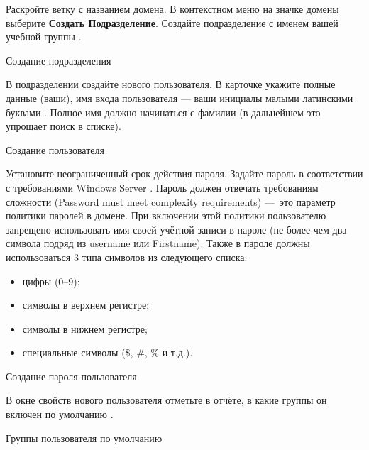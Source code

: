 Раскройте ветку с названием домена.
В контекстном меню на значке домены выберите
\textbf{Создать \rarrow Подразделение}.
Создайте подразделение с именем вашей учебной группы .

\begin{image}
	\caption{Создание подразделения}
	\label{fig:new:group}
\end{image}

В подразделении создайте нового пользователя.
В карточке укажите полные данные (ваши),
имя входа пользователя --- ваши инициалы малыми латинскими буквами
.
Полное имя должно начинаться с фамилии
(в дальнейшем это упрощает поиск в списке).

\begin{image}
	\caption{Создание пользователя}
	\label{fig:new:user}
\end{image}

Установите неограниченный срок действия пароля.
Задайте пароль в соответствии с требованиями Windows Server
.
Пароль должен отвечать требованиям сложности
(Password must meet complexity requirements)
---~это параметр политики паролей в домене.
При включении этой политики пользователю запрещено использовать
имя своей учётной записи в пароле
(не более чем два символа подряд из username или Firstname).
Также в пароле должны использоваться 3 типа символов из следующего списка:

\begin{itemize}
	\item цифры (0–9);
	\item символы в верхнем регистре;
	\item символы в нижнем регистре;
	\item специальные символы (\$, \#, \% и т.д.).
\end{itemize}

\begin{image}
	\caption{Создание пароля пользователя}
	\label{fig:new:user:passw}
\end{image}

В окне свойств нового пользователя отметьте в отчёте,
в какие группы он включен по умолчанию .

\begin{image}
	\caption{Группы пользователя по умолчанию}
	\label{fig:new:user:group}
\end{image}


